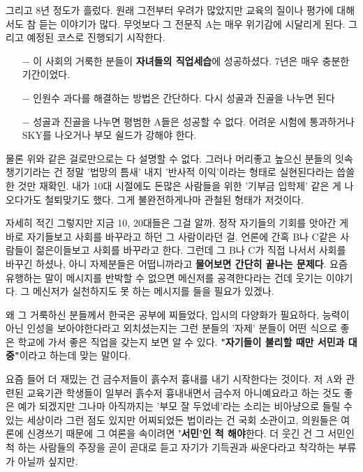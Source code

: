 그리고 8년 정도가 흘렀다. 원래 그전부터 우려가 많았지만 교육의 질이나 평가에 대해서도 참 듣는 이야기가 많다.
무엇보다 그 전문직 A는 매우 위기감에 시달리게 된다.
그리고 예정된 코스로 진행되기 시작한다.
\vspace{5mm}

\begin{itemize}
    \item[$-$] 이 사회의 거룩한 분들이 \textbf{자녀들의 직업세습}에 성공하셨다. 7년은 매우 충분한 기간이었다.
    \item[$-$] 인원수 과다를 해결하는 방법은 간단하다. 다시 성골과 진골을 나누면 된다
    \item[$-$] 성골과 진골을 나누면 평범한 A들은 성공할 수 없다. 어려운 시험에 통과하거나 SKY를 나오거나 부모 쉴드가 강해야 한다.
\end{itemize}
\vspace{5mm}

물론 위와 같은 걸로만으로는 다 설명할 수 없다.
그러나 머리좋고 높으신 분들의 잇속 챙기기라는 건 정말 '법망의 틈새' 내지 '반사적 이익'이라는 형태로 실현된다라는 씁쓸한 것만 재확인.
내가 10대 시절에도 돈많은 사람들을 위한 '기부금 입학제' 같은 게 나오다가도 철퇴맞기도 했다.
그게 불완전하게나마 관철된 형태가 저것이다.
\vspace{5mm}

자세히 적긴 그렇지만 지금 10, 20대들은 그걸 알까. 정작 자기들의 기회를 앗아간 게 바로 자기들보고 사회를 바꾸라고 하던 그 사람이라던 걸.
언론에 간혹 B나 C같은 사람들이 젊은이들보고 사회를 바꾸라고 한다.
그런데 그 B나 C가 직접 나서서 사회를 바꾸긴 하셨나, 아니 자제분들은 어떱니까라고 \textbf{물어보면 간단히 끝나는 문제다}.
요즘 유행하는 말이 메시지를 반박할 수 없으면 메신저를 공격한다라는 건데 웃기는 이야기다.
그 메신저가 실천하지도 못 하는 메시지를 들을 필요가 있겠나.
\vspace{5mm}

왜 그 거룩하신 분들께서
한국은 공부에 찌들었다, 입시의 다양화가 필요하다, 능력이 아닌 인성을 보아야한다라고  외치셨는지는
그런 분들의 '자제' 분들이 어떤 식으로 좋은 학교에 가서 좋은 직업을 갖는지 보면 알 수 있다.
\textbf{"자기들이 불리할 때만 서민과 대중"}이라고 하는데 맞는 말이다.
\vspace{5mm}

요즘 들어 더 재밌는 건 금수저들이 흙수저 흉내를 내기 시작한다는 것이다.
저 A와 관련된 교육기관 학생들이 일부러 흙수저 흉내내면서 금수저 아니예요라고 하는 것도 좋은 예가 되겠지만
그나마 아직까지는 '부모 잘 두었네'라는 소리는 비아냥으로 들릴 수 있는 세상이라 그런 점도 있지만
어찌되었든 법이라는 건 국회 소관이고, 의원들은 여론에 신경쓰기 때문에 그 여론을 속이려면 \textbf{'서민'인 척 해야}한다.
더 웃긴 건 그 서민인 척 하는 사람들의 주장을 곧이 곧대로 듣고 자기가 기득권과 싸운다라고 착각하는 부류가 아닐까 싶지만.
\vspace{5mm}










